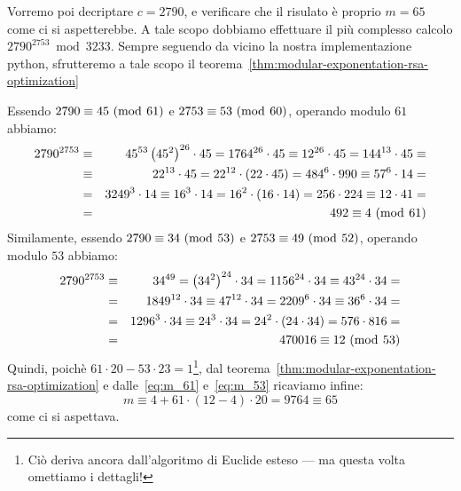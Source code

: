 \documentclass[pdflatex,11pt,a4paper,oneside]{article}
\newcommand{\p}[1]{\left({#1}\right)}
\newcommand{\congruent}[0]{\equiv}
\newcommand{\mmodop}[0]{\ensuremath{\operatorname{mod}}}
\newcommand{\mmod}[1]{\ensuremath{\allowbreak\ (\mmodop\:{#1})}}
\newcommand{\rem}[2]{\ensuremath{{#1}\:\mmodop\:{#2}}}
\begin{document}
\medskip
Vorremo poi decriptare $c = 2790$, e verificare che il risulato \`e
proprio $m = 65$ come ci si aspetterebbe. A tale scopo dobbiamo
effettuare il pi\`u complesso calcolo $\rem{2790^{2753}}{3233}$.
Sempre seguendo da vicino la nostra implementazione python, sfrutteremo a
tale scopo il teorema~\eqref{thm:modular-exponentation-rsa-optimization}

\smallskip
Essendo $2790 \congruent 45 \mmod{61}$ e $2753 \congruent 53 \mmod{60}$,
operando modulo $61$ abbiamo:
{
  \setlength\arraycolsep{2pt}
  \begin{eqnarray}
  2790^{2753}
    & \congruent &
      {45}^{53} \p{{45}^2}^{26} \cdot 45 = 1764^{26} \cdot 45 \congruent
      12^{26} \cdot 45 = 144^{13} \cdot 45 \congruent
    \nonumber\\
    & \congruent &
      22^{13} \cdot 45 = 22^{12} \cdot \p{22 \cdot 45} = {484}^6 \cdot 990
      \congruent {57}^6 \cdot 14 =
    \nonumber\\
    & = &
      3249^3 \cdot 14 \congruent 16^3 \cdot 14 = 16^2 \cdot \p{16 \cdot 14}
      = 256 \cdot 224 \congruent 12 \cdot 41 =
    \nonumber\\
    \label{eq:m_61}
    & = &
      492 \congruent 4 \mmod{61}
  \end{eqnarray}
  Similamente, essendo $2790 \congruent 34 \mmod{53}$ e
  $2753 \congruent 49 \mmod{52}$, operando modulo $53$ abbiamo:
  \begin{eqnarray}
  2790^{2753}
    & \congruent &
      {34}^{49} = \p{{34}^2}^{24} \cdot 34 = 1156^{24} \cdot 34
      \congruent 43^{24} \cdot 34 =
    \nonumber\\
    & = &
      1849^{12} \cdot 34 \congruent 47^{12} \cdot 34 = {2209}^6 \cdot 34
      \congruent 36^6 \cdot 34 =
    \nonumber\\
    & = &
      1296^3 \cdot 34 \congruent 24^3 \cdot 34 = 24^2 \cdot \p{24 \cdot 34}
      = 576 \cdot 816 =
    \nonumber\\
    \label{eq:m_53}
    & = &
      470016 \congruent 12 \mmod{53}
  \end{eqnarray}
}%
Quindi, poich\`e $61 \cdot 20 - 53 \cdot 23 = 1$\footnote{Ci\`o deriva
ancora dall'algoritmo di Euclide esteso --- ma questa volta omettiamo i
dettagli!}, dal teorema~\eqref{thm:modular-exponentation-rsa-optimization}
e dalle~\eqref{eq:m_61} e~\eqref{eq:m_53} ricaviamo infine:
\begin{displaymath}
  m \congruent 4 + 61 \cdot \p{12 - 4} \cdot 20 = 9764 \congruent 65
\end{displaymath}
come ci si aspettava.
\end{document}
